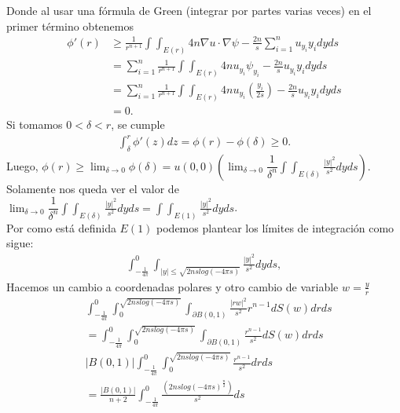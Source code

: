 \begin{homeworkProblem}
\begin{solucion}
    Donde al usar una fórmula de Green (integrar por partes varias veces) en el primer término obtenemos
    \begin{align*}
      \phi ' (r) &\geq \frac{1}{r^{n+1}} \int \int_{E(r)} 4n \nabla u \cdot \nabla \psi - \frac{2n}{s} \displaystyle \sum_{i=1}^{n} u_{y_{i}}y_{i} dyds\\ 
                 &=\displaystyle \sum_{i=1}^{n} \frac{1}{r^{n+1}} \int \int_{E(r)} 4n u_{y_{i}} \psi_{y_{i}} - \frac{2n}{s} u_{y_{i}}y_{i} dyds\\ 
                 &= \displaystyle \sum_{i=1}^{n} \frac{1}{r^{n+1}} \int \int_{E(r)} 4n u_{y_{i}} \left( \frac{y_{i}}{2s}\right) - \frac{2n}{s} u_{y_{i}}y_{i} dyds\\ 
                 &=0.
    \end{align*} 
    Si tomamos $0< \delta < r$, se cumple
    \begin{align*}
      \int_{\delta}^{r} \phi '(z) dz = \phi(r) - \phi(\delta) \geq 0.
    \end{align*}
    Luego, $\phi(r) \geq \lim_{\delta \rightarrow 0} \phi(\delta) = u(0,0) \left(\lim_{\delta \rightarrow 0} \dfrac{1}{\delta ^{n}} \displaystyle \int \displaystyle \int_{E(\delta)} \frac{|y|^{2}}{s^{2}} dyds\right)$.\\ 
    Solamente nos queda ver el valor de $\lim_{\delta \rightarrow 0} \dfrac{1}{\delta ^{n}} \displaystyle \int \displaystyle \int_{E(\delta)} \frac{|y|^{2}}{s^{2}} dyds = \displaystyle \int \displaystyle \int_{E(1)} \frac{|y|^{2}}{s^{2}} dyds$.\\ 
    Por como está definida $E(1)$ podemos plantear los límites de integración como sigue:
    \begin{align*}
      \int_{-\frac{1}{4\pi}}^{0} \int_{|y| \leq \sqrt{2nslog(-4\pi s)}} \frac{|y|^{2}}{s^{2}} dyds,
    \end{align*}
    Hacemos un cambio a coordenadas polares y otro cambio de variable $w = \frac{y}{r}$
    \begin{align*}
      &\int_{-\frac{1}{4\pi}}^{0} \int_{0}^{\sqrt{2nslog(-4\pi s)}} \int_{\partial B(0,1)} \frac{|rw|^{2}}{s^{2}} r^{n-1} dS(w)drds\\
      &= \int_{-\frac{1}{4\pi}}^{0} \int_{0}^{\sqrt{2nslog(-4\pi s)}} \int_{\partial B(0,1)} \frac{r^{n-1}}{s^{2}} dS(w)drds\\
      &|B(0,1)| \int_{-\frac{1}{4\pi}}^{0} \int_{0}^{\sqrt{2nslog(-4\pi s)}} \frac{r^{n-1}}{s^{2}} drds\\ 
      &= \frac{|B(0,1)|}{n+2} \int_{-\frac{1}{4\pi}}^{0} \frac{(2nslog(-4\pi s)^{\frac{n}{2}})}{s^{2}} ds\\

\end{align*}
\end{solucion}
\end{homeworkProblem}
